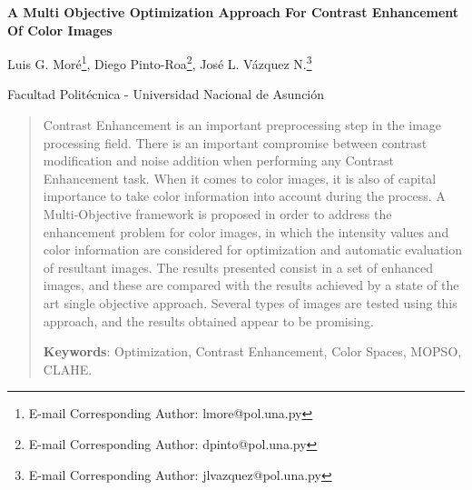 \documentclass[english,11pt]{article}
\begin{document}

\pagestyle{myheadings}


\vspace{1.2cm}


\begin{center}

{\bf  {\Large A Multi Objective Optimization Approach For Contrast Enhancement Of Color Images}}
\bigskip


{\small Luis G. Moré\footnote{E-mail Corresponding Author: lmore@pol.una.py}, Diego Pinto-Roa\footnote{E-mail Corresponding Author: dpinto@pol.una.py}, José L. Vázquez N.\footnote{E-mail Corresponding Author: jlvazquez@pol.una.py}
}
\smallskip

{\small
Facultad Politécnica - Universidad Nacional de Asunción\\
}



\end{center}

\quad


\begin{abstract}
Contrast Enhancement is an important preprocessing step in the image processing field. There is an important compromise between contrast modification and noise addition when performing any Contrast Enhancement task. When it comes to color images, it is also of capital importance to take color information into account during the process. A Multi-Objective framework is proposed in order to address the enhancement problem for color images, in which the intensity values and color information are considered for optimization and automatic evaluation of resultant images. The results presented consist in a set of enhanced images, and these are compared with the results achieved by a state of the art single objective approach. Several types of images are tested using this approach, and the results obtained appear to be promising.


\quad

{\footnotesize
{\bf Keywords}: Optimization, Contrast Enhancement, Color Spaces, MOPSO, CLAHE.}
\end{abstract}
\end{document}
